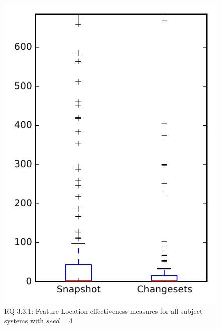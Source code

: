 
\begin{figure}
\centering
\includegraphics[height=0.4\textheight]{figures/flt_seed/rq1_overview_4}
\caption{RQ 3.3.1: Feature Location effectiveness measures for all subject systems with $seed=4$}
\label{fig:flt_seed:rq1:overview}
\end{figure}
